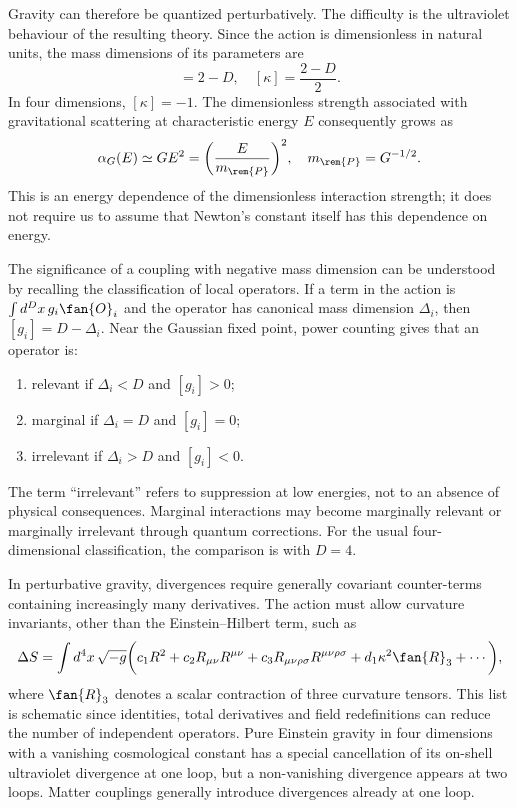 Gravity can therefore be quantized perturbatively. The difficulty is the ultraviolet behaviour of the resulting theory. Since the action is dimensionless in natural units, the mass dimensions of its parameters are
\begin{equation}
    [G_D] = 2 - D,\quad [\kappa] = \frac{2-D}{2}.
\end{equation}
In four dimensions, $[\kappa] = -1$. The dimensionless strength associated with gravitational scattering at characteristic energy $E$ consequently grows as
\begin{equation}
    \alpha_G(E)\simeq GE^2 = \bigg(\frac{E}{m_{\rem{P}}}\bigg)^2,\quad m_{\rem{P}} = G^{-1/2}.
\end{equation}
This is an energy dependence of the dimensionless interaction strength; it does not require us to assume that Newton's constant itself has this dependence on energy.

The significance of a coupling with negative mass dimension can be understood by recalling the classification of local operators. If a term in the action is $\int d^D x\,g_i\fan{O}_i$ and the operator has canonical mass dimension $\Delta_i$, then $[g_i] = D - \Delta_i$. Near the Gaussian fixed point, power counting gives that an operator is:
\begin{enumerate}
    \item relevant if $\Delta_i < D$ and $[g_i] > 0$;
    \item marginal if $\Delta_i = D$ and $[g_i] = 0$;
    \item irrelevant if $\Delta_i > D$ and $[g_i] < 0$.
\end{enumerate}
The term ``irrelevant'' refers to suppression at low energies, not to an absence of physical consequences. Marginal interactions may become marginally relevant or marginally irrelevant through quantum corrections. For the usual four-dimensional classification, the comparison is with $D=4$.

In perturbative gravity, divergences require generally covariant counter-terms containing increasingly many derivatives. The action must allow curvature invariants, other than the Einstein--Hilbert term, such as
\begin{equation}
    \Delta S = \int d^4x\,\sqrt{-g}\bigg(c_1R^2 + c_2R_{\mu\nu}R^{\mu\nu} + c_3R_{\mu\nu\rho\sigma}R^{\mu\nu\rho\sigma} + d_1\kappa^2\fan{R}_3 + \cdots\bigg),
\end{equation}
where $\fan{R}_3$ denotes a scalar contraction of three curvature tensors. This list is schematic since identities, total derivatives and field redefinitions can reduce the number of independent operators. Pure Einstein gravity in four dimensions with a vanishing cosmological constant has a special cancellation of its on-shell ultraviolet divergence at one loop, but a non-vanishing divergence appears at two loops. Matter couplings generally introduce divergences already at one loop.

